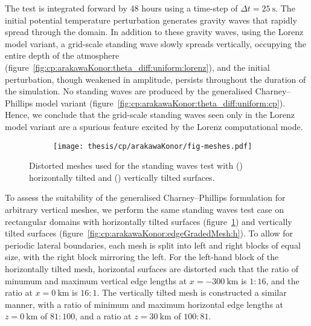 The test is integrated forward by 48 hours using a time-step of $\Delta t = \SI{25}{\second}$.
The initial potential temperature perturbation generates gravity waves that rapidly spread through the domain.
In addition to these gravity waves, using the Lorenz model variant, a grid-scale standing wave slowly spreads vertically, occupying the entire depth of the atmosphere (figure~\ref{fig:cp:arakawaKonor:theta_diff:uniform:lorenz}), and the initial perturbation, though weakened in amplitude, persists throughout the duration of the simulation.
No standing waves are produced by the generalised Charney--Phillips model variant (figure~\ref{fig:cp:arakawaKonor:theta_diff:uniform:cp}).
Hence, we conclude that the grid-scale standing waves seen only in the Lorenz model variant are a spurious feature excited by the Lorenz computational mode.

\begin{figure}
	\centering
	\begin{subfigure}{\textwidth}
		\label{fig:cp:arakawaKonor:edgeGradedMesh:h}
		\label{fig:cp:arakawaKonor:edgeGradedMesh:v}
		\texttt{[image: thesis/cp/arakawaKonor/fig-meshes.pdf]}
	\end{subfigure}
%
	\caption{Distorted meshes used for the standing waves test with
	() horizontally tilted and
	() vertically tilted surfaces.}
	\label{fig:cp:arakawaKonor:edgeGradedMesh}
\end{figure}

To assess the suitability of the generalised Charney--Phillips formulation for arbitrary vertical meshes, we perform the same standing waves test case on rectangular domains with horizontally tilted surfaces (figure~\ref{fig:cp:arakawaKonor:edgeGradedMesh:v}) and vertically tilted surfaces (figure~\ref{fig:cp:arakawaKonor:edgeGradedMesh:h}).
To allow for periodic lateral boundaries, each mesh is split into left and right blocks of equal size, with the right block mirroring the left.
For the left-hand block of the horizontally tilted mesh, horizontal surfaces are distorted such that the ratio of minumum and maximum vertical edge lengths at $x = \SI{-300}{\kilo\meter}$ is $1 \mathbin{:} 16$, and the ratio at $x = \SI{0}{\kilo\meter}$ is $16 \mathbin{:} 1$.
The vertically tilted mesh is constructed a similar manner, with a ratio of minimum and maximum horizontal edge lengths at $z = \SI{0}{\kilo\meter}$ of $81 \mathbin{:} 100$, and a ratio at $z = \SI{30}{\kilo\meter}$ of $100 \mathbin{:} 81$.


